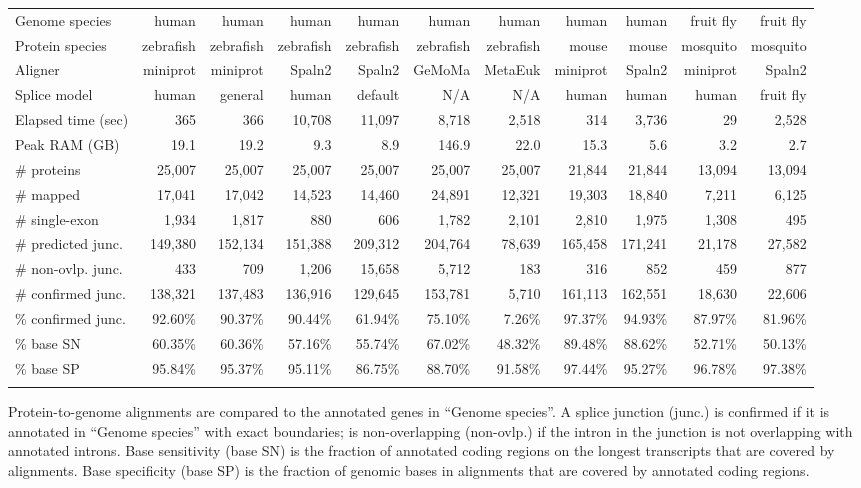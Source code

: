 \documentclass{bioinfo}
\begin{document}
\begin{table*}[!tb]
{\label{tab:eval}
\begin{tabular*}{\textwidth}{@{\extracolsep{\fill}}lrrrrrrrrrr}
\toprule
Genome species     & human   & human   & human   & human   & human   & human   & human   & human   &fruit fly&fruit fly \\
Protein species    &zebrafish&zebrafish&zebrafish&zebrafish&zebrafish&zebrafish& mouse   & mouse   & mosquito& mosquito \\
Aligner            & miniprot& miniprot& Spaln2  & Spaln2  &  GeMoMa & MetaEuk & miniprot& Spaln2  & miniprot& Spaln2 \\
Splice model       & human   & general & human   & default &     N/A &     N/A & human   & human   & human   &fruit fly \\
\midrule
Elapsed time (sec) &     365 &     366 &  10,708 &  11,097 &   8,718 &   2,518 &     314 &   3,736 &      29 &   2,528 \\
Peak RAM (GB)      &    19.1 &    19.2 &     9.3 &     8.9 &   146.9 &    22.0 &    15.3 &     5.6 &     3.2 &     2.7 \\
\# proteins        &  25,007 &  25,007 &  25,007 &  25,007 &  25,007 &  25,007 &  21,844 &  21,844 &  13,094 &  13,094 \\
\# mapped          &  17,041 &  17,042 &  14,523 &  14,460 &  24,891 &  12,321 &  19,303 &  18,840 &   7,211 &   6,125 \\
\# single-exon     &   1,934 &   1,817 &     880 &     606 &   1,782 &   2,101 &   2,810 &   1,975 &   1,308 &     495 \\
\# predicted junc. & 149,380 & 152,134 & 151,388 & 209,312 & 204,764 &  78,639 & 165,458 & 171,241 &  21,178 &  27,582 \\
\# non-ovlp. junc. &     433 &     709 &   1,206 &  15,658 &   5,712 &     183 &     316 &     852 &     459 &     877 \\
\# confirmed junc. & 138,321 & 137,483 & 136,916 & 129,645 & 153,781 &   5,710 & 161,113 & 162,551 &  18,630 &  22,606 \\
\% confirmed junc. & 92.60\% & 90.37\% & 90.44\% & 61.94\% & 75.10\% &  7.26\% & 97.37\% & 94.93\% & 87.97\% & 81.96\% \\
\% base SN         & 60.35\% & 60.36\% & 57.16\% & 55.74\% & 67.02\% & 48.32\% & 89.48\% & 88.62\% & 52.71\% & 50.13\% \\
\% base SP         & 95.84\% & 95.37\% & 95.11\% & 86.75\% & 88.70\% & 91.58\% & 97.44\% & 95.27\% & 96.78\% & 97.38\% \\
\botrule
\end{tabular*}
}{Protein-to-genome alignments are compared to the annotated genes in ``Genome
species''. A splice junction (junc.) is confirmed if it is annotated in
``Genome species'' with exact boundaries; is non-overlapping (non-ovlp.) if the
intron in the junction is not overlapping with annotated introns. Base
sensitivity (base SN) is the fraction of annotated coding regions on the
longest transcripts that are covered by alignments. Base specificity (base SP)
is the fraction of genomic bases in alignments that are covered by annotated
coding regions.}
\end{table*}
\end{document}
